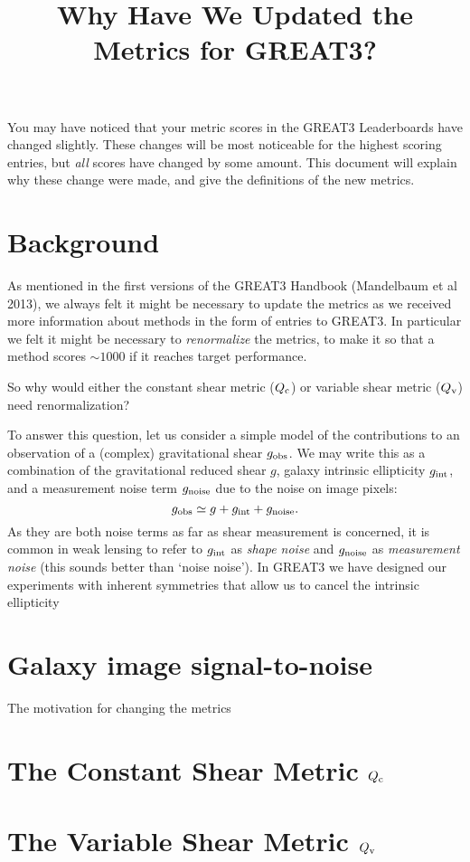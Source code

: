 \documentclass[preprint,11pt]{aastex}
\begin{document}
\setlength{\parskip}{2.0ex plus 0.5ex minus 0.5ex}
\setlength{\parindent}{0cm} 

\title{Why Have We Updated the Metrics for GREAT3?}

You may have noticed that your metric scores in the GREAT3
Leaderboards have changed slightly.  These changes will be most
noticeable for the highest scoring entries, but \emph{all} scores have
changed by some amount.  This document will explain why these change
were made, and give the definitions of the new metrics.

\section{Background}
As mentioned in the first versions of the GREAT3 Handbook (Mandelbaum
et al 2013), we always felt it
might be necessary to update the metrics as we received more
information about methods in the form of entries to GREAT3.  In
particular we felt it might be necessary to \emph{renormalize} the
metrics, to make it so that a method scores $\sim 1000$ if it reaches
target performance.

So why would either the constant shear metric ($Q_{\rm c}$) or
variable shear metric ($Q_{\rm v}$) need renormalization?

To answer this question, let us consider a simple model of the
contributions to an observation of a (complex) gravitational shear $g_{\rm obs}$.
We may write this as a combination of the gravitational reduced shear $g$, galaxy intrinsic ellipticity
$g_{\rm int}$, and a measurement noise term $g_{\rm noise}$ due to the
noise on image pixels:
\begin{equation}
g_{\rm obs} \simeq g + g_{\rm int} + g_{\rm noise}.
\end{equation}
As they are both noise terms as far as shear measurement is concerned,
it is common in weak lensing to refer to $g_{\rm int}$ as \emph{shape
  noise} and $g_{\rm noise}$ as \emph{measurement noise} (this sounds
better than `noise noise').
In GREAT3 we have designed our experiments with inherent symmetries
that allow us to cancel the intrinsic ellipticity

\section{Galaxy image signal-to-noise}\label{sec:snr}
The motivation for changing the metrics

\section{The Constant Shear Metric $Q_{\rm c}$}\label{sec:qc}

\section{The Variable Shear Metric $Q_{\rm v}$}\label{sec:qv}
\end{document}
